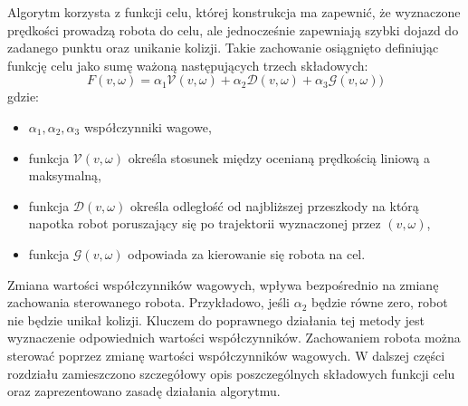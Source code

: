 	Algorytm korzysta z funkcji celu, której konstrukcja ma zapewnić, że wyznaczone prędkości prowadzą robota do celu, ale jednocześnie zapewniają szybki dojazd do zadanego punktu
	oraz unikanie kolizji.
	Takie zachowanie osiągnięto definiując funkcję celu jako sumę ważoną następujących trzech składowych:
	\begin{equation} \label{eq:fcelu_cvm}
	F(v,\omega)=\alpha_1 \mathcal{V}(v,\omega)+\alpha_2 \mathcal{D}(v,\omega) + \alpha_3 \mathcal{G} (v,\omega))
	\end{equation}
	gdzie:
	\begin{itemize}
	 \item $\alpha_1, \alpha_2, \alpha_3$ współczynniki wagowe,
	 \item funkcja $\mathcal{V}(v,\omega)$ określa stosunek między ocenianą prędkością liniową a maksymalną,
	 \item funkcja $\mathcal{D}(v,\omega)$ określa odległość od najbliższej przeszkody na którą napotka robot poruszający się po trajektorii wyznaczonej przez $(v,\omega)$,
	 \item funkcja $\mathcal{G}(v,\omega)$ odpowiada za kierowanie się robota na cel.
	\end{itemize}
	Zmiana wartości współczynników wagowych, wpływa bezpośrednio na zmianę zachowania sterowanego robota. Przykładowo, jeśli $\alpha_2$ będzie równe zero, robot nie będzie unikał kolizji.
	Kluczem do poprawnego działania tej metody jest wyznaczenie odpowiednich wartości współczynników.
	Zachowaniem robota można sterować poprzez zmianę wartości współczynników wagowych. W dalszej części rozdziału zamieszczono szczegółowy opis poszczególnych składowych funkcji celu
	oraz zaprezentowano zasadę działania algorytmu.

